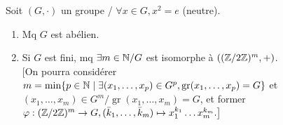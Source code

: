 
\begin{statementbox}
Soit $(G, \cdot)$ un groupe / $\forall x \in G, x^2 = e$ (neutre).
\begin{enumerate}[label=\alph*)]
  \item Mq $G$ est abélien.
  \item Si $G$ est fini, mq $\exists m \in \mathbb N / G$ est isomorphe à $((\mathbb Z/2\mathbb Z)^m, +)$. \\
  $\big[$On pourra considérer $m = \min \{p \in \mathbb N \mid \exists (x_1, \dots, x_p) \in G^p, \operatorname{gr}(x_1, \dots, x_p) = G\}$ et $(x_1, \dots, x_m) \in G^m / \operatorname{gr}(x_1, \dots, x_m) = G$, et former $\varphi : (\mathbb Z/2\mathbb Z)^m \to G, (\bar{k}_1, \dots, \bar{k}_m) \mapsto x_1^{k_1} \dots x_m^{k_m}.\big]$
\end{enumerate}
\end{statementbox}

